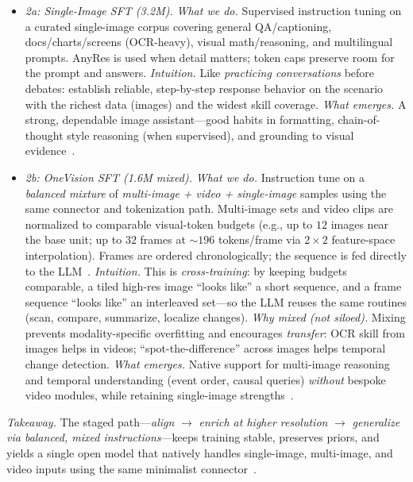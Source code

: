 \begin{enrichment}
\begin{enrichment}
\begin{enumerate}
            \begin{itemize}
                \item \emph{2a: Single-Image SFT (3.2M).}  
                \emph{What we do.} Supervised instruction tuning on a curated single-image corpus covering general QA/captioning, docs/charts/screens (OCR-heavy), visual math/reasoning, and multilingual prompts. AnyRes is used when detail matters; token caps preserve room for the prompt and answers.  
                \emph{Intuition.} Like \emph{practicing conversations} before debates: establish reliable, step-by-step response behavior on the scenario with the richest data (images) and the widest skill coverage.  
                \emph{What emerges.} A strong, dependable image assistant—good habits in formatting, chain-of-thought style reasoning (when supervised), and grounding to visual evidence~\cite{li2024_llavaonevision}.
                
                \item \emph{2b: OneVision SFT (1.6M mixed).}  
                \emph{What we do.} Instruction tune on a \emph{balanced mixture} of \textit{multi-image + video + single-image} samples using the same connector and tokenization path. Multi-image sets and video clips are normalized to comparable visual-token budgets (e.g., up to $12$ images near the base unit; up to $32$ frames at $\sim196$ tokens/frame via $2{\times}2$ feature-space interpolation). Frames are ordered chronologically; the sequence is fed directly to the LLM~\cite{li2024_llavaonevision}.  
                \emph{Intuition.} This is \emph{cross-training}: by keeping budgets comparable, a tiled high-res image “looks like” a short sequence, and a frame sequence “looks like” an interleaved set—so the LLM reuses the same routines (scan, compare, summarize, localize changes).  
                \emph{Why mixed (not siloed).} Mixing prevents modality-specific overfitting and encourages \emph{transfer}: OCR skill from images helps in videos; “spot-the-difference” across images helps temporal change detection.  
                \emph{What emerges.} Native support for multi-image reasoning and temporal understanding (event order, causal queries) \emph{without} bespoke video modules, while retaining single-image strengths~\cite{li2024_llavaonevision}.
            \end{itemize}
        \end{enumerate}
        
        \noindent\textit{Takeaway.} The staged path—\emph{align} $\rightarrow$ \emph{enrich at higher resolution} $\rightarrow$ \emph{generalize via balanced, mixed instructions}—keeps training stable, preserves priors, and yields a single open model that natively handles single-image, multi-image, and video inputs using the same minimalist connector~\cite{li2024_llavaonevision}.
        

\end{enrichment}
\end{enrichment}
